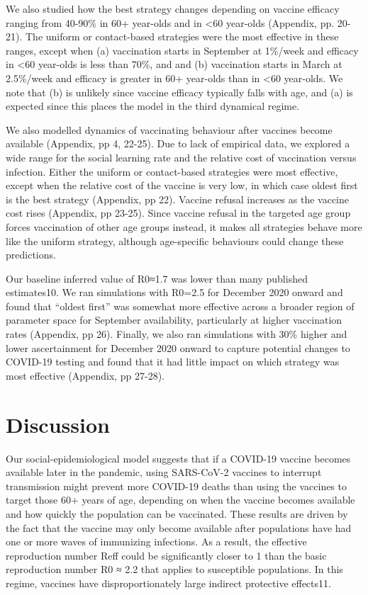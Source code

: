 We also studied how the best strategy changes depending on vaccine efficacy ranging from 40-90\% in 60+ year-olds and in <60 year-olds (Appendix, pp. 20-21). The uniform or contact-based strategies were the most effective in these ranges, except when (a) vaccination starts in September at 1\%/week and efficacy in <60 year-olds is less than 70\%, and and (b) vaccination starts in March at 2.5\%/week and efficacy is greater in 60+ year-olds than in <60 year-olds. We note that (b) is unlikely since vaccine efficacy typically falls with age, and (a) is expected since this places the model in the third dynamical regime. 

We also modelled dynamics of vaccinating behaviour after vaccines become available (Appendix, pp 4, 22-25).  Due to lack of empirical data, we explored a wide range for the social learning rate and the relative cost of vaccination versus infection.  Either the uniform or contact-based strategies were most effective, except when the relative cost of the vaccine is very low, in which case oldest first is the best strategy (Appendix, pp 22). Vaccine refusal increases as the vaccine cost rises (Appendix, pp 23-25). Since vaccine refusal in the targeted age group forces vaccination of other age groups instead, it makes all strategies behave more like the uniform strategy, although age-specific behaviours could change these predictions. 

Our baseline inferred value of R0≈1.7 was lower than many published estimates10.  We ran simulations with R0=2.5 for December 2020 onward and found that “oldest first” was somewhat more effective across a broader region of parameter space for September availability, particularly at higher vaccination rates (Appendix, pp 26). Finally, we also ran simulations with 30\% higher and lower ascertainment for December 2020 onward to capture potential changes to COVID-19 testing and found that it had little impact on which strategy was most effective (Appendix, pp 27-28).  

\section{Discussion}

Our social-epidemiological model suggests that if a COVID-19 vaccine becomes available later in the pandemic, using SARS-CoV-2 vaccines to interrupt transmission might prevent more COVID-19 deaths than using the vaccines to target those 60+ years of age, depending on when the vaccine becomes available and how quickly the population can be vaccinated. These results are driven by the fact that the vaccine may only become available after populations have had one or more waves of immunizing infections. As a result, the effective reproduction number Reff could be significantly closer to 1 than the basic reproduction number R0 ≈ 2.2 that applies to susceptible populations. In this regime, vaccines have disproportionately large indirect protective effects11.  

